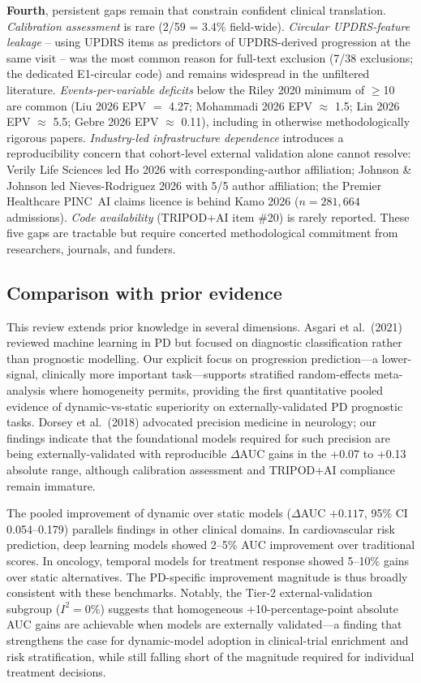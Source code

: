 \textbf{Fourth}, persistent gaps remain that constrain confident clinical translation. \emph{Calibration assessment} is rare (2/59 = 3.4\% field-wide). \emph{Circular UPDRS-feature leakage} -- using UPDRS items as predictors of UPDRS-derived progression at the same visit -- was the most common reason for full-text exclusion (7/38 exclusions; the dedicated E1-circular code) and remains widespread in the unfiltered literature. \emph{Events-per-variable deficits} below the Riley 2020 minimum of $\geq$10~\cite{riley2020} are common (Liu 2026 EPV $=$ 4.27; Mohammadi 2026 EPV $\approx$ 1.5; Lin 2026 EPV $\approx$ 5.5; Gebre 2026 EPV $\approx$ 0.11), including in otherwise methodologically rigorous papers. \emph{Industry-led infrastructure dependence} introduces a reproducibility concern that cohort-level external validation alone cannot resolve: Verily Life Sciences led Ho 2026 with corresponding-author affiliation; Johnson \& Johnson led Nieves-Rodriguez 2026 with 5/5 author affiliation; the Premier Healthcare PINC~AI claims licence is behind Kamo 2026 ($n=281{,}664$ admissions). \emph{Code availability} (TRIPOD+AI item \#20) is rarely reported. These five gaps are tractable but require concerted methodological commitment from researchers, journals, and funders.

\subsection{Comparison with prior evidence}
\label{sr:sec:discussion:comparison}

This review extends prior knowledge in several dimensions. Asgari et al.\ (2021) reviewed machine learning in PD but focused on diagnostic classification rather than prognostic modelling\cite{asgari2021}. Our explicit focus on progression prediction---a lower-signal, clinically more important task---supports stratified random-effects meta-analysis where homogeneity permits, providing the first quantitative pooled evidence of dynamic-vs-static superiority on externally-validated PD prognostic tasks. Dorsey et al.\ (2018) advocated precision medicine in neurology\cite{dorsey2018}; our findings indicate that the foundational models required for such precision are being externally-validated with reproducible $\Delta$AUC gains in the +0.07 to +0.13 absolute range, although calibration assessment and TRIPOD+AI compliance remain immature.

The pooled improvement of dynamic over static models ($\Delta$AUC $+0.117$, 95\% CI 0.054--0.179) parallels findings in other clinical domains. In cardiovascular risk prediction, deep learning models showed 2--5\% AUC improvement over traditional scores\cite{rajkomar2018}. In oncology, temporal models for treatment response showed 5--10\% gains over static alternatives\cite{topol2019}. The PD-specific improvement magnitude is thus broadly consistent with these benchmarks. Notably, the Tier-2 external-validation subgroup ($I^2 = 0\%$) suggests that homogeneous +10-percentage-point absolute AUC gains are achievable when models are externally validated---a finding that strengthens the case for dynamic-model adoption in clinical-trial enrichment and risk stratification, while still falling short of the magnitude required for individual treatment decisions.

